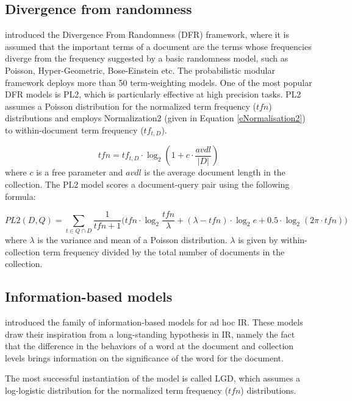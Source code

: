 \subsection{Divergence from randomness}

\citet*{dfr} introduced the Divergence From Randomness (DFR) framework, where it is assumed that the important terms of a document are the terms whose frequencies diverge from the frequency suggested by a basic randomness model, such as Poisson, Hyper-Geometric, Bose-Einstein etc.
The probabilistic modular framework deploys more than 50 term-weighting models.
One of the most popular DFR models is PL2, which is particularly effective at high precision tasks.
PL2 assumes a Poisson distribution for the normalized term frequency ($tfn$) distributions and employs Normalization2 (given in Equation \ref{eNormalisation2}) to within-document term frequency ($tf_{t,D}$).

\begin{equation}\label{eNormalisation2}
tfn = tf_{t,D} \cdot \log_2 (1 + c \cdot \frac{avdl}{|D|})
\end{equation}
where $c$ is a free parameter and $avdl$ is the average document length in the collection.
The PL2 model scores a document-query pair using the following formula:

\begin{equation}\label{pl2}
PL2(D, Q)=\sum_{t \in Q \cap D} \frac{1}{tfn+1}\big(tfn\cdot\log_2\frac{tfn}{\lambda}+(\lambda-tfn)\cdot\log_2e+0.5\cdot\log_2(2\pi\cdot tfn)\big)
\end{equation}
where $\lambda$ is the variance and mean of a Poisson distribution.
$\lambda$ is given by within-collection term frequency divided by the total number of documents in the collection.

\subsection{Information-based models}
\citet*{lgd09,lgd10,lgd11} introduced the family of information-based models for ad hoc IR. 
These models draw their inspiration from a long-standing hypothesis in IR, namely the fact that the difference in the behaviors of a word at the document and collection levels brings information on the significance of the word for the document. 

The most successful instantiation of the model is called LGD, which assumes a log-logistic distribution for the normalized term frequency ($tfn$) distributions.

